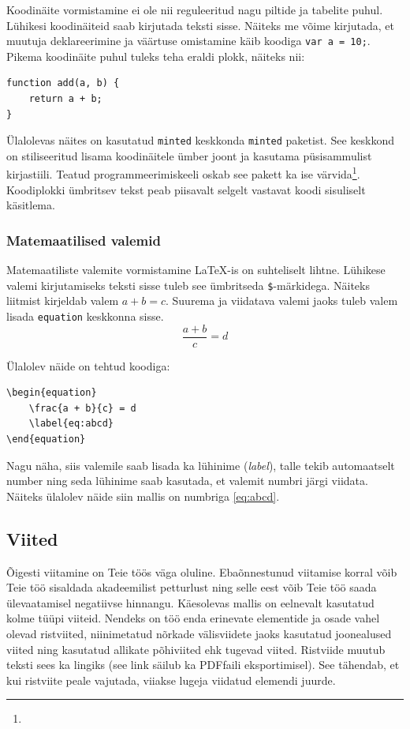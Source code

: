Koodinäite vormistamine ei ole nii reguleeritud nagu piltide ja tabelite puhul. Lühikesi koodinäiteid saab kirjutada teksti sisse. Näiteks me võime kirjutada, et muutuja deklareerimine ja väärtuse omistamine käib koodiga \verb|var a = 10;|. Pikema koodinäite puhul tuleks teha eraldi plokk, näiteks nii:

\begin{verbatim}
function add(a, b) {
    return a + b;
}
\end{verbatim}

Ülalolevas näites on kasutatud \verb|minted| keskkonda \verb|minted| paketist. See keskkond on stiliseeritud lisama koodinäitele ümber joont ja kasutama püsisammulist kirjastiili. Teatud programmeerimiskeeli oskab see pakett ka ise värvida\footnote{}. Koodiplokki ümbritsev tekst peab piisavalt selgelt vastavat koodi sisuliselt käsitlema.

\subsubsection{Matemaatilised valemid}
Matemaatiliste valemite vormistamine LaTeX-is on suhteliselt lihtne. Lühikese valemi kirjutamiseks teksti sisse tuleb see ümbritseda \verb|$|-märkidega. Näiteks liitmist kirjeldab valem $a+b=c$. Suurema ja viidatava valemi jaoks tuleb valem lisada \verb|equation| keskkonna sisse.
\begin{equation}
    \frac{a + b}{c} = d
    \label{eq:abcd}
\end{equation}

Ülalolev näide on tehtud koodiga:
\begin{verbatim}
\begin{equation}
    \frac{a + b}{c} = d
    \label{eq:abcd}
\end{equation}
\end{verbatim}

Nagu näha, siis valemile saab lisada ka lühinime (\emph{label}), talle tekib automaatselt number ning seda lühinime saab kasutada, et valemit numbri järgi viidata. Näiteks ülalolev näide siin mallis on numbriga \ref{eq:abcd}.

\subsection{Viited}
Õigesti viitamine on Teie töös väga oluline. Ebaõnnestunud viitamise korral võib Teie töö sisaldada akadeemilist petturlust ning selle eest võib Teie töö saada ülevaatamisel negatiivse hinnangu. Käesolevas mallis on eelnevalt kasutatud kolme tüüpi viiteid. Nendeks on töö enda erinevate elementide ja osade vahel olevad ristviited, niinimetatud nõrkade välisviidete jaoks kasutatud joonealused viited ning kasutatud allikate põhiviited ehk tugevad viited. Ristviide muutub teksti sees ka lingiks (see link säilub ka PDF{}faili eksportimisel). See tähendab, et kui ristviite peale vajutada, viiakse lugeja viidatud elemendi juurde.

